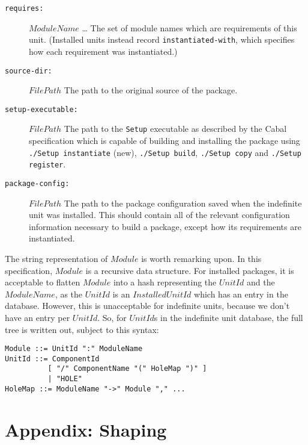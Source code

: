 \documentclass{article}
\newcommand{\I}[1]{\ensuremath{\mathit{#1}}}
\begin{document}
\begin{description}
    \item[\texttt{requires:}] \I{ModuleName} \ldots \newline
        The set of module names which are requirements of this unit.
        (Installed units instead record \texttt{instantiated-with}, which
        specifies how each requirement was instantiated.)
    \item[\texttt{source-dir:}] \I{FilePath} \newline
        The path to the original source of the package.
    \item[\texttt{setup-executable:}] \I{FilePath} \newline
        The path to the \texttt{Setup} executable as described by the Cabal
        specification which is capable of building and installing the package
        using \texttt{./Setup instantiate} (new),
        \texttt{./Setup build}, \texttt{./Setup copy} and
        \texttt{./Setup register}.
    \item[\texttt{package-config:}] \I{FilePath} \newline
        The path to the package configuration saved when the indefinite
        unit was installed.  This should contain all of the relevant configuration
        information necessary to build a package, except how its requirements
        are instantiated.
\end{description}
%
The string representation of \I{Module} is worth remarking upon.  In
this specification, \I{Module} is a recursive data structure.  For
installed packages, it is acceptable to flatten \I{Module} into a
hash representing the \I{UnitId} and the \I{ModuleName}, as the \I{UnitId}
is an \I{InstalledUnitId} which has an entry in the database.  However,
this is unacceptable for indefinite units, because we don't have an
entry per \I{UnitId}.  So, for \I{UnitId}s in the indefinite unit database,
the full tree is written out, subject to this syntax:

\begin{verbatim}
Module ::= UnitId ":" ModuleName
UnitId ::= ComponentId
          [ "/" ComponentName "(" HoleMap ")" ]
          | "HOLE"
HoleMap ::= ModuleName "->" Module "," ...
\end{verbatim}

\section{Appendix: Shaping}
\end{document}
